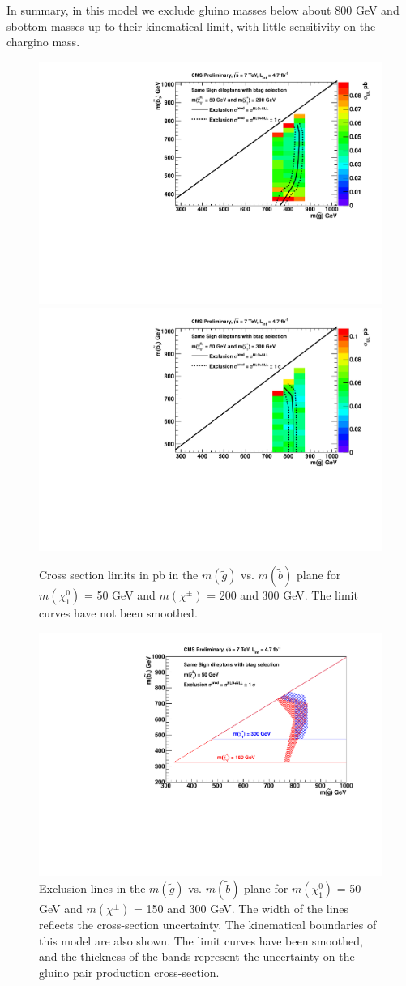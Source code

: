 In summary, in this model 
we exclude gluino masses below about 800 GeV and 
sbottom masses up to their kinematical limit,
with little sensitivity on the chargino mass.


\begin{figure}[htb]
\begin{center}
\includegraphics[width=0.49\linewidth]{figs/B2_LimitsOnCarpet_200.pdf}
\includegraphics[width=0.49\linewidth]{figs/B2_LimitsOnCarpet_300.pdf}
\caption{Cross section limits in pb in the $m(\widetilde{g})$ vs. 
$m(\widetilde{b})$ plane
for $m(\chi_1^0)$ = 50 GeV and 
$m(\chi^{\pm})$ = 200 and 300 GeV.
The limit curves have not been smoothed.
\label{fig:mglinoSbottom2}}
\end{center}
\end{figure}

\begin{figure}[htb]
\begin{center}
\includegraphics[width=0.49\linewidth]{figs/B2_CheeseWedge.pdf}
\caption{Exclusion lines in the $m(\widetilde{g})$ vs. 
$m(\widetilde{b})$ plane
for $m(\chi_1^0)$ = 50 GeV and 
$m(\chi^{\pm})$ = 150 and 300 GeV.  The width of the lines
reflects the cross-section uncertainty.  The kinematical boundaries
of this model are also shown.
The limit curves have been smoothed, and the thickness of the
bands represent the uncertainty on the gluino pair production cross-section.
\label{fig:sbottom_cheese}}
\end{center}
\end{figure}




